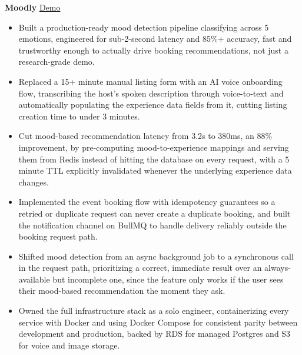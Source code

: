 \documentclass[10pt, letterpaper]{article}
\newcommand{\projheader}[4]{%
  \noindent\textbf{#1}\;{\color{lightgray}|}\;{\small #2}\;{\color{lightgray}|}\;
  {\small\color{accentblue}\href{#3}{Demo}}%
  \hfill{\small\color{lightgray}\textit{#4}}\\[-2pt]}
\begin{document}
\projheader{Moodly}{AI Experience Booking Platform}{https://talha-atif.vercel.app/projects/moodly}{}
\begin{itemize}
  \item Built a production-ready mood detection pipeline classifying across 5 emotions, engineered
        for sub-2-second latency and 85\%+ accuracy, fast and trustworthy enough to actually drive
        booking recommendations, not just a research-grade demo.
  \item Replaced a 15+ minute manual listing form with an AI voice onboarding flow, transcribing the
        host's spoken description through voice-to-text and automatically populating the experience
        data fields from it, cutting listing creation time to under 3 minutes.
  \item Cut mood-based recommendation latency from 3.2s to 380ms, an 88\% improvement, by pre-computing
        mood-to-experience mappings and serving them from Redis instead of hitting the database on
        every request, with a 5 minute TTL explicitly invalidated whenever the underlying experience
        data changes.
  \item Implemented the event booking flow with idempotency guarantees so a retried or duplicate
        request can never create a duplicate booking, and built the notification channel on BullMQ to
        handle delivery reliably outside the booking request path.
  \item Shifted mood detection from an async background job to a synchronous call in the request path,
        prioritizing a correct, immediate result over an always-available but incomplete one, since
        the feature only works if the user sees their mood-based recommendation the moment they ask.
  \item Owned the full infrastructure stack as a solo engineer, containerizing every service with
        Docker and using Docker Compose for consistent parity between development and production,
        backed by RDS for managed Postgres and S3 for voice and image storage.
\end{itemize}

\vspace{4pt}
\end{document}
